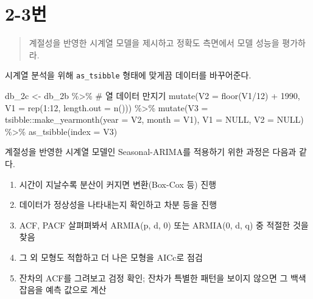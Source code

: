 \documentclass[
  letterpaper,
  DIV=11,
  numbers=noendperiod]{scrreprt}
\newenvironment{Shaded}{\begin{snugshade}}{\end{snugshade}}
\newcommand{\AttributeTok}[1]{\textcolor[rgb]{0.40,0.45,0.13}{#1}}
\newcommand{\CommentTok}[1]{\textcolor[rgb]{0.37,0.37,0.37}{#1}}
\newcommand{\ConstantTok}[1]{\textcolor[rgb]{0.56,0.35,0.01}{#1}}
\newcommand{\DecValTok}[1]{\textcolor[rgb]{0.68,0.00,0.00}{#1}}
\newcommand{\FunctionTok}[1]{\textcolor[rgb]{0.28,0.35,0.67}{#1}}
\newcommand{\NormalTok}[1]{\textcolor[rgb]{0.00,0.23,0.31}{#1}}
\newcommand{\OtherTok}[1]{\textcolor[rgb]{0.00,0.23,0.31}{#1}}
\newcommand{\SpecialCharTok}[1]{\textcolor[rgb]{0.37,0.37,0.37}{#1}}
\providecommand{\tightlist}{%
  \setlength{\itemsep}{0pt}\setlength{\parskip}{0pt}}\usepackage{longtable,booktabs,array}
\begin{document}
\hypertarget{uxbc88-46}{%
\section*{2-3번}\label{uxbc88-46}}


\begin{quote}
계절성을 반영한 시계열 모델을 제시하고 정확도 측면에서 모델 성능을
평가하라.
\end{quote}

시계열 분석을 위해 \texttt{as\_tsibble} 형태에 맞게끔 데이터를
바꾸어준다.

\begin{Shaded}
\begin{Highlighting}[]
\NormalTok{db\_2c }\OtherTok{\textless{}{-}}\NormalTok{ db\_2b }\SpecialCharTok{\%\textgreater{}\%}
  \CommentTok{\# 열 데이터 만지기}
  \FunctionTok{mutate}\NormalTok{(}\AttributeTok{V2 =} \FunctionTok{floor}\NormalTok{(V1}\SpecialCharTok{/}\DecValTok{12}\NormalTok{) }\SpecialCharTok{+} \DecValTok{1990}\NormalTok{,}
         \AttributeTok{V1 =} \FunctionTok{rep}\NormalTok{(}\DecValTok{1}\SpecialCharTok{:}\DecValTok{12}\NormalTok{, }\AttributeTok{length.out =} \FunctionTok{n}\NormalTok{())) }\SpecialCharTok{\%\textgreater{}\%}
  \FunctionTok{mutate}\NormalTok{(}\AttributeTok{V3 =}\NormalTok{ tsibble}\SpecialCharTok{::}\FunctionTok{make\_yearmonth}\NormalTok{(}\AttributeTok{year =}\NormalTok{ V2, }\AttributeTok{month =}\NormalTok{ V1),}
         \AttributeTok{V1 =} \ConstantTok{NULL}\NormalTok{, }\AttributeTok{V2 =} \ConstantTok{NULL}\NormalTok{) }\SpecialCharTok{\%\textgreater{}\%}
  \FunctionTok{as\_tsibble}\NormalTok{(}\AttributeTok{index =}\NormalTok{ V3)}
\end{Highlighting}
\end{Shaded}

계절성을 반영한 시계열 모델인 Seasonal-ARIMA를 적용하기 위한 과정은
다음과 같다.

\begin{enumerate}
\def\labelenumi{\arabic{enumi})}
\tightlist
\item
  시간이 지날수록 분산이 커지면 변환(Box-Cox 등) 진행
\item
  데이터가 정상성을 나타내는지 확인하고 차분 등을 진행
\item
  ACF, PACF 살펴펴봐서 ARMIA(p, d, 0) 또는 ARMIA(0, d, q) 중 적절한 것을
  찾음
\item
  그 외 모형도 적합하고 더 나은 모형을 AICc로 점검
\item
  잔차의 ACF를 그려보고 검정 확인; 잔차가 특별한 패턴을 보이지 않으면 그
  백색 잡음을 예측 값으로 계산
\end{enumerate}
\end{document}
